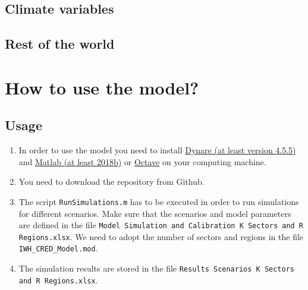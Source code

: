 \documentclass[10pt,a4paper]{article}
\begin{document}
\subsection{Climate variables}

\subsection{Rest of the world}


\cleardoublepage
\section{How to use the model?}\label{sec:modelusage}
\subsection{Usage}
\begin{enumerate}
\item In order to use the model you need to install \href{https://www.dynare.org/}{Dynare (at least version 4.5.5)}  and \href{https://www.mathworks.com/products/matlab.html}{Matlab (at least 2018b)} or \href{https://www.gnu.org/software/octave/}{Octave} on your computing machine. 
\item You need to download the repository from Github. 
\item The script {\tt RunSimulations.m} has to be executed in order to run simulations for different scenarios. Make sure that the scenarios and model parameters are defined in the file {\tt Model Simulation and Calibration K Sectors and R Regions.xlsx}. We need to adopt the number of sectors and regions in the file {\tt IWH\_CRED\_Model.mod}.
\item The simulation results are stored in the file {\tt Results Scenarios K Sectors and R Regions.xlsx}.
\end{enumerate}
\end{document}
